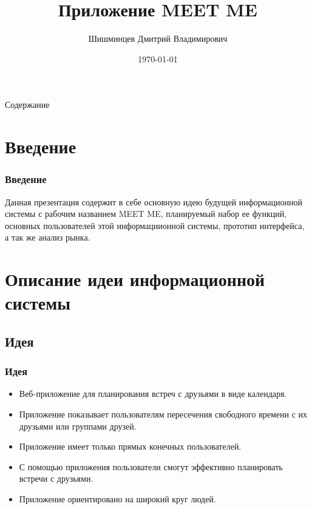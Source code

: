 \documentclass[aspectratio=169]{beamer}
\title[ITMO LaTex]{Приложение MEET ME}
\author[Шишминцев Д. В.]{Шишминцев Дмитрий Владимирович}
\date{\today}
\begin{document}

\begin{frame}[plain]
    \titlepage
\end{frame}





\begin{frame}{Содержание}
    \tableofcontents
\end{frame}





\section{Введение}

\begin{frame}
\frametitle{Введение}
Данная презентация содержит в себе основную идею будущей информационной системы с рабочим названием MEET ME, планируемый набор ее функций, основных пользователей этой информациионной системы, прототип интерфейса, а так же анализ рынка.

\end{frame}


\section{Описание идеи информационной системы}

\subsection{Идея}
\begin{frame}
\frametitle{Идея}
\begin{itemize}
    \item Веб-приложение для планирования встреч с друзьями в виде календаря. 
    \item Приложение показывает пользователям пересечения свободного времени с их друзьями или группами друзей.
    \item Приложение имеет только прямых конечных пользователей.
    \item С помощью приложения пользователи смогут эффективно планировать встречи с друзьями.
    \item Приложение ориентировано на широкий круг людей.
\end{itemize}
    
\end{frame}
\end{document}
